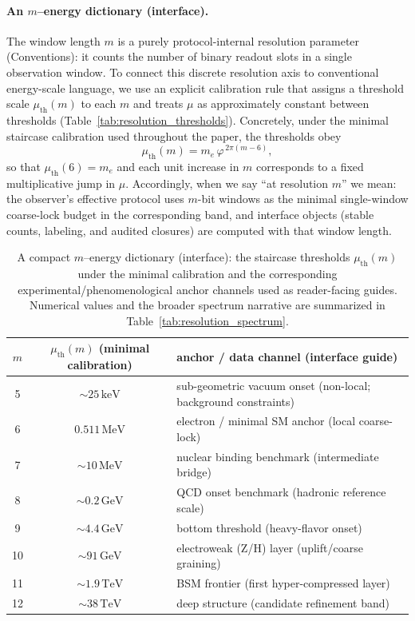 \paragraph{An \texorpdfstring{$m$}{m}--energy dictionary (interface).}
The window length $m$ is a purely protocol-internal resolution parameter (Conventions): it counts the number of binary readout slots in a single observation window.
To connect this discrete resolution axis to conventional energy-scale language, we use an explicit calibration rule that assigns a threshold scale $\mu_{\mathrm{th}}(m)$ to each $m$ and treats $\mu$ as approximately constant between thresholds (Table~\ref{tab:resolution_thresholds}).
Concretely, under the minimal staircase calibration used throughout the paper, the thresholds obey
\[
\mu_{\mathrm{th}}(m)=m_e\,\varphi^{\,2\pi(m-6)},
\]
so that $\mu_{\mathrm{th}}(6)=m_e$ and each unit increase in $m$ corresponds to a fixed multiplicative jump in $\mu$.
Accordingly, when we say ``at resolution $m$'' we mean: the observer's effective protocol uses $m$-bit windows as the minimal single-window coarse-lock budget in the corresponding band, and interface objects (stable counts, labeling, and audited closures) are computed with that window length.

\begin{table}[H]
\centering
\scriptsize
\setlength{\tabcolsep}{7pt}
\renewcommand{\arraystretch}{1.15}
\caption{A compact $m$--energy dictionary (interface): the staircase thresholds $\mu_{\mathrm{th}}(m)$ under the minimal calibration and the corresponding experimental/phenomenological anchor channels used as reader-facing guides. Numerical values and the broader spectrum narrative are summarized in Table~\ref{tab:resolution_spectrum}.}
\label{tab:m_energy_dictionary_compact}
\begin{tabular}{c c l}
\toprule
$m$ & $\mu_{\mathrm{th}}(m)$ (minimal calibration) & anchor / data channel (interface guide) \\
\midrule
5 & $\sim 25\,\mathrm{keV}$ & sub-geometric vacuum onset (non-local; background constraints) \\
6 & $0.511\,\mathrm{MeV}$ & electron / minimal SM anchor (local coarse-lock) \\
7 & $\sim 10\,\mathrm{MeV}$ & nuclear binding benchmark (intermediate bridge) \\
8 & $\sim 0.2\,\mathrm{GeV}$ & QCD onset benchmark (hadronic reference scale) \\
9 & $\sim 4.4\,\mathrm{GeV}$ & bottom threshold (heavy-flavor onset) \\
10 & $\sim 91\,\mathrm{GeV}$ & electroweak (Z/H) layer (uplift/coarse graining) \\
11 & $\sim 1.9\,\mathrm{TeV}$ & BSM frontier (first hyper-compressed layer) \\
12 & $\sim 38\,\mathrm{TeV}$ & deep structure (candidate refinement band) \\
\bottomrule
\end{tabular}
\end{table}

